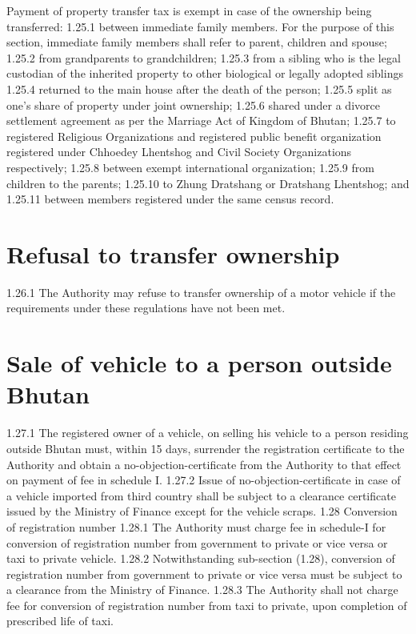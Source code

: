\documentclass[
]{book}
\begin{document}
Payment of property transfer tax is exempt in case of the ownership being transferred:
1.25.1 between immediate family members. For the purpose of this section, immediate family members shall refer to parent, children and spouse;
1.25.2 from grandparents to grandchildren;
1.25.3 from a sibling who is the legal custodian of the inherited property to other biological or legally adopted siblings
1.25.4 returned to the main house after the death of the person;
1.25.5 split as one's share of property under joint ownership;
1.25.6 shared under a divorce settlement agreement as per the Marriage Act of Kingdom of Bhutan;
1.25.7 to registered Religious Organizations and registered public benefit organization registered under Chhoedey Lhentshog and Civil Society Organizations respectively;
1.25.8 between exempt international organization;
1.25.9 from children to the parents;
1.25.10 to Zhung Dratshang or Dratshang Lhentshog; and
1.25.11 between members registered under the same census record.

\hypertarget{refusal-to-transfer-ownership}{%
\section{Refusal to transfer ownership}\label{refusal-to-transfer-ownership}}

1.26.1 The Authority may refuse to transfer ownership of a motor vehicle if the requirements under these regulations have not been met.

\hypertarget{sale-of-vehicle-to-a-person-outside-bhutan}{%
\section{Sale of vehicle to a person outside Bhutan}\label{sale-of-vehicle-to-a-person-outside-bhutan}}

1.27.1 The registered owner of a vehicle, on selling his vehicle to a person residing outside Bhutan must, within 15 days, surrender the registration certificate to the Authority and obtain a no-objection-certificate from the Authority to that effect on payment of fee in schedule I.
1.27.2 Issue of no-objection-certificate in case of a vehicle imported from third country shall be subject to a clearance certificate issued by the Ministry of Finance except for the vehicle scraps.
1.28 Conversion of registration number
1.28.1 The Authority must charge fee in schedule-I for conversion of registration number from government to private or vice versa or taxi to private vehicle.
1.28.2 Notwithstanding sub-section (1.28), conversion of registration number from government to private or vice versa must be subject to a clearance from the Ministry of Finance.
1.28.3 The Authority shall not charge fee for conversion of registration number from taxi to private, upon completion of prescribed life of taxi.
\end{document}
